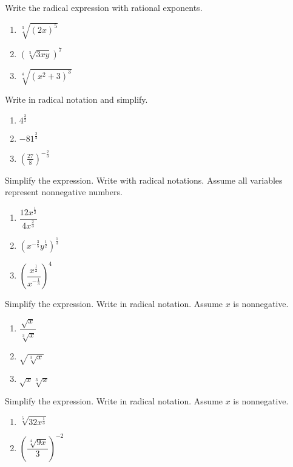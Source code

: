 \begin{exercise}
  Write the radical expression with rational exponents.
  
  \begin{enumerate}
  \item
    \(\sqrt[3]{(2x)^5}\)
  \item
    \((\sqrt[5]{3xy})^7\)
  \item
    \(\sqrt[4]{(x^2+3)^3}\)
  \end{enumerate}
\end{exercise}

\begin{exercise}
  Write in radical notation and simplify.
  
  \begin{enumerate}
  \item
    \(4^{\frac32}\)
  \item
    \(-81^{\frac 34}\)
  \item
    \(\left(\frac{27}{8}\right)^{-\frac{2}{3}}\)
  \end{enumerate}
\end{exercise}

\begin{exercise}
  Simplify the expression. Write with radical notations. Assume all
  variables represent nonnegative numbers.
  
  \begin{enumerate}
  \item
    \(\dfrac{12x^{\frac12}}{4x^{\frac23}}\)
  \item
    \((x^{-\frac35}y^{\frac12})^{\frac13}\)
  \item
    \(\left(\dfrac{x^{\frac12}}{x^{-\frac13}}\right)^4\)
  \end{enumerate}
\end{exercise}

\begin{exercise}
  Simplify the expression. Write in radical notation. Assume \(x\) is
  nonnegative.
  
  \begin{enumerate}
  \item
    \(\dfrac{\sqrt{x}}{\sqrt[3]{x}}\)
  \item
    \(\sqrt{\sqrt[3]{x}}\)
  \item
    \(\sqrt{x}\sqrt[3]{x}\)
  \end{enumerate}
\end{exercise}

\begin{exercise}
  Simplify the expression. Write in radical notation. Assume \(x\) is
  nonnegative.
  
  \begin{enumerate}
  \item
    \(\sqrt[5]{32x^{\frac13}}\)
  \item
    \(\left(\dfrac{\sqrt[4]{9x}}{3}\right)^{-2}\)
  \end{enumerate}
\end{exercise}

